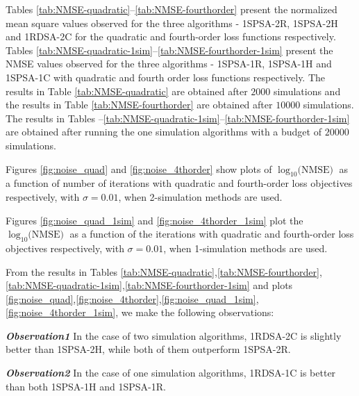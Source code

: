 Tables \ref{tab:NMSE-quadratic}--\ref{tab:NMSE-fourthorder} present the 
normalized mean square values observed for the three algorithms - 1SPSA-2R, 1SPSA-2H and 
1RDSA-2C for the quadratic and fourth-order loss functions respectively.
Tables \ref{tab:NMSE-quadratic-1sim}--\ref{tab:NMSE-fourthorder-1sim} present 
the NMSE values observed for the three algorithms - 1SPSA-1R, 1SPSA-1H  and 1SPSA-1C
with quadratic and fourth order loss functions respectively. 
The results  in Table \ref{tab:NMSE-quadratic} are obtained after $2000$ simulations and
the results in Table \ref{tab:NMSE-fourthorder} are obtained after $10000$ simulations.
The results in Tables --\ref{tab:NMSE-quadratic-1sim}--\ref{tab:NMSE-fourthorder-1sim} are 
obtained after running the one simulation algorithms with a budget of $20000$ simulations. 

Figures \ref{fig:noise_quad} and \ref{fig:noise_4thorder} show plots of $\log_{10}\text{(NMSE)}$ as
a function of number of iterations with quadratic and fourth-order loss objectives respectively,
with $\sigma=0.01$, when 2-simulation methods are used. 


Figures \ref{fig:noise_quad_1sim} and \ref{fig:noise_4thorder_1sim} plot the 
$\log_{10}\text{(NMSE)}$ as a function of the iterations with quadratic and fourth-order loss 
objectives respectively, with $\sigma=0.01$, when 1-simulation methods are used. 

From the results in Tables \ref{tab:NMSE-quadratic},\ref{tab:NMSE-fourthorder},
\ref{tab:NMSE-quadratic-1sim},\ref{tab:NMSE-fourthorder-1sim} and 
plots \ref{fig:noise_quad},\ref{fig:noise_4thorder},\ref{fig:noise_quad_1sim}, 
\ref{fig:noise_4thorder_1sim}, we make the following observations:
 
\textit{\textbf{Observation1}} In the case of two simulation algorithms, 
1RDSA-2C is slightly better than 1SPSA-2H, while both of them outperform 1SPSA-2R.

\textit{\textbf{Observation2}} In the case of one simulation algorithms, 
1RDSA-1C is better than both 1SPSA-1H and 1SPSA-1R.


